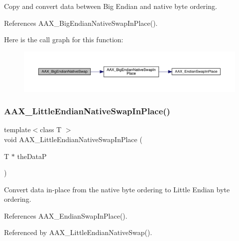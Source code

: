 Copy and convert data between Big Endian and native byte ordering. 



References A\+A\+X\+\_\+\+Big\+Endian\+Native\+Swap\+In\+Place().

Here is the call graph for this function\+:
\nopagebreak
\begin{figure}[H]
\begin{center}
\leavevmode
\includegraphics[width=350pt]{a00488_a7387790d73eed6c54af682c7afd9e463_cgraph}
\end{center}
\end{figure}
\mbox{\label{a00488_af4164bdfb3807edcd582e0289a6ed59a}} 
\subsubsection{\texorpdfstring{AAX\_LittleEndianNativeSwapInPlace()}{AAX\_LittleEndianNativeSwapInPlace()}}
{\footnotesize\ttfamily template$<$class T $>$ \\
void A\+A\+X\+\_\+\+Little\+Endian\+Native\+Swap\+In\+Place (\begin{DoxyParamCaption}\item[{T $\ast$}]{the\+DataP }\end{DoxyParamCaption})\hspace{0.3cm}{\ttfamily [inline]}}



Convert data in-\/place from the native byte ordering to Little Endian byte ordering. 



References A\+A\+X\+\_\+\+Endian\+Swap\+In\+Place().



Referenced by A\+A\+X\+\_\+\+Little\+Endian\+Native\+Swap().

